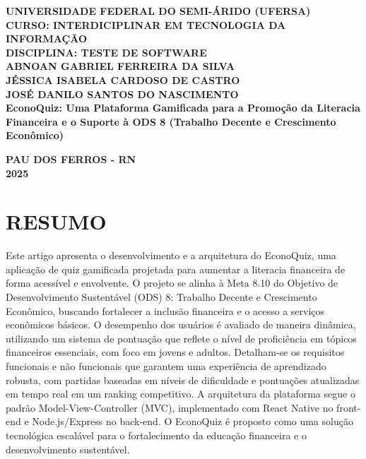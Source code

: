 \documentclass[12pt,a4paper]{article}
\begin{document}
\begin{titlepage}
    \centering
    \vspace*{1cm}
    
    \textbf{\Large UNIVERSIDADE FEDERAL DO SEMI-ÁRIDO (UFERSA)}\\[0.3cm]
    \textbf{\large CURSO: INTERDICIPLINAR EM TECNOLOGIA DA INFORMAÇÃO}\\[0.3cm]
    \textbf{\large DISCIPLINA: TESTE DE SOFTWARE}\\[2cm]
    
    \textbf{ABNOAN GABRIEL FERREIRA DA SILVA}\\
    \textbf{JÉSSICA ISABELA CARDOSO DE CASTRO}\\
    \textbf{JOSÉ DANILO SANTOS DO NASCIMENTO}\\[4cm]
    
    \textbf{\Large EconoQuiz: Uma Plataforma Gamificada para a Promoção da Literacia Financeira e o Suporte à ODS 8 (Trabalho Decente e Crescimento Econômico)}\\[4cm]
    
    \vfill
    
    \textbf{PAU DOS FERROS - RN}\\
    \textbf{2025}
\end{titlepage}


\section*{RESUMO}

Este artigo apresenta o desenvolvimento e a arquitetura do EconoQuiz, uma aplicação de quiz gamificada projetada para aumentar a literacia financeira de forma acessível e envolvente. O projeto se alinha à Meta 8.10 do Objetivo de Desenvolvimento Sustentável (ODS) 8: Trabalho Decente e Crescimento Econômico, buscando fortalecer a inclusão financeira e o acesso a serviços econômicos básicos. O desempenho dos usuários é avaliado de maneira dinâmica, utilizando um sistema de pontuação que reflete o nível de proficiência em tópicos financeiros essenciais, com foco em jovens e adultos. Detalham-se os requisitos funcionais e não funcionais que garantem uma experiência de aprendizado robusta, com partidas baseadas em níveis de dificuldade e pontuações atualizadas em tempo real em um ranking competitivo. A arquitetura da plataforma segue o padrão Model-View-Controller (MVC), implementado com React Native no front-end e Node.js/Express no back-end. O EconoQuiz é proposto como uma solução tecnológica escalável para o fortalecimento da educação financeira e o desenvolvimento sustentável.
\end{document}

